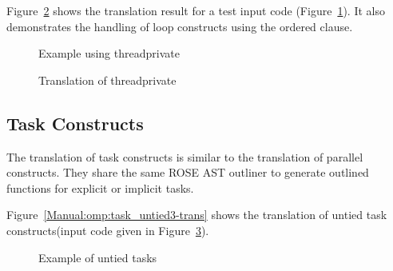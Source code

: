 Figure~\ref{Manual:omp:threadprivate-trans} shows the translation result for a test input code (Figure~\ref{Manual:omp:threadprivate}). It also demonstrates the handling of loop constructs using the ordered clause.

\lstset{language=C,basicstyle=\scriptsize}
\begin{figure}[htbp]
{\indent
  {\mySmallFontSize
    \begin{latexonly}
    
    \end{latexonly}
    \begin{htmlonly}
    
    \end{htmlonly}
  }
}
\caption{Example using threadprivate}
\label{Manual:omp:threadprivate}
\end{figure}

\begin{figure}[htbp]
{\indent
  {\mySmallFontSize
    \begin{latexonly}
    
    \end{latexonly}
    \begin{htmlonly}
    
    \end{htmlonly}
  }
}
\caption{Translation of threadprivate}
\label{Manual:omp:threadprivate-trans}
\end{figure}


\clearpage
\subsection{Task Constructs}
The translation of task constructs is similar to the translation of parallel constructs. 
They share the same ROSE AST outliner to generate outlined functions for
explicit or implicit tasks.

Figure~\ref{Manual:omp:task_untied3-trans} shows the translation of untied task constructs(input code given in
Figure~\ref{Manual:omp:task_untied3}). 

\lstset{language=C,basicstyle=\scriptsize}
\begin{figure}[htbp]
{\indent
  {\mySmallFontSize
    \begin{latexonly}
    
    \end{latexonly}
    \begin{htmlonly}
    
    \end{htmlonly}
  }
}
\caption{Example of untied tasks}
\label{Manual:omp:task_untied3}
\end{figure}

